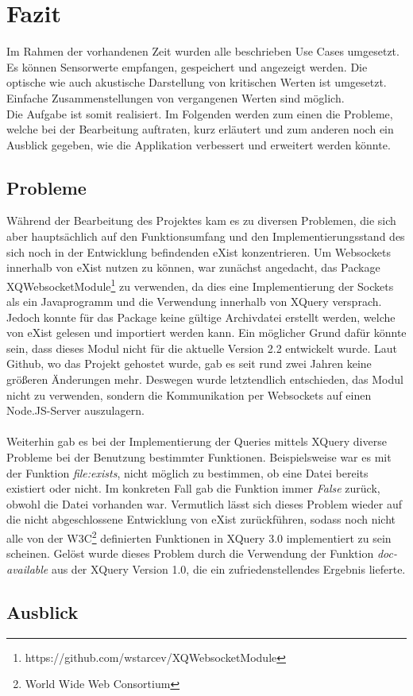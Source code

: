 \section{Fazit}
\label{sec:Fazit}
Im Rahmen der vorhandenen Zeit wurden alle beschrieben Use Cases umgesetzt. Es können Sensorwerte empfangen, gespeichert und angezeigt werden. Die optische wie auch akustische Darstellung von kritischen Werten ist umgesetzt. Einfache Zusammenstellungen von vergangenen Werten sind möglich.\\
Die Aufgabe ist somit realisiert. Im Folgenden werden zum einen die Probleme, welche bei der Bearbeitung auftraten, kurz erläutert und zum anderen noch ein Ausblick gegeben, wie die Applikation verbessert und erweitert werden könnte.


\subsection{Probleme}
\label{subsec:Probleme}
Während der Bearbeitung des Projektes kam es zu diversen Problemen, die sich aber hauptsächlich auf den Funktionsumfang und den Implementierungsstand des sich noch in der Entwicklung befindenden eXist konzentrieren. Um Websockets innerhalb von eXist nutzen zu können, war zunächst angedacht, das Package XQWebsocketModule\footnote[1]{https://github.com/wstarcev/XQWebsocketModule} zu verwenden, da dies eine Implementierung der Sockets als ein Javaprogramm und die Verwendung innerhalb von XQuery versprach. Jedoch konnte für das Package keine gültige Archivdatei erstellt werden, welche von eXist gelesen und importiert werden kann. Ein möglicher Grund dafür könnte sein, dass dieses Modul nicht für die aktuelle Version 2.2 entwickelt wurde. Laut Github, wo das Projekt gehostet wurde, gab es seit rund zwei Jahren keine größeren Änderungen mehr. Deswegen wurde letztendlich entschieden, das Modul nicht zu verwenden, sondern die Kommunikation per Websockets auf einen Node.JS-Server auszulagern.
\\
\\
Weiterhin gab es bei der Implementierung der Queries mittels XQuery diverse Probleme bei der Benutzung bestimmter Funktionen. Beispielsweise war es mit der Funktion \textit{file:exists}, nicht möglich zu bestimmen, ob eine Datei bereits existiert oder nicht. Im konkreten Fall gab die Funktion immer \textit{False} zurück, obwohl die Datei vorhanden war. Vermutlich lässt sich dieses Problem wieder auf die nicht abgeschlossene Entwicklung von eXist zurückführen, sodass noch nicht alle von der W3C\footnote[2]{World Wide Web Consortium} definierten Funktionen in XQuery 3.0 implementiert zu sein scheinen. Gelöst wurde dieses Problem durch die Verwendung der Funktion \textit{doc-available} aus der XQuery Version 1.0, die ein zufriedenstellendes Ergebnis lieferte.

\subsection{Ausblick}
\label{subsec:Ausblick}